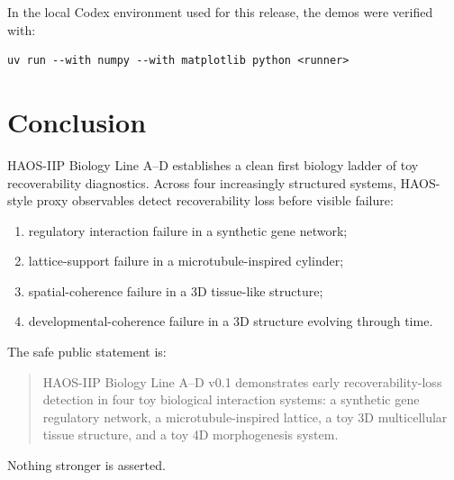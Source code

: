 \documentclass[11pt]{article}
\begin{document}
In the local Codex environment used for this release, the demos were verified with:

\begin{verbatim}
uv run --with numpy --with matplotlib python <runner>
\end{verbatim}

\section{Conclusion}

HAOS-IIP Biology Line A--D establishes a clean first biology ladder of toy recoverability diagnostics. Across four increasingly structured systems, HAOS-style proxy observables detect recoverability loss before visible failure:

\begin{enumerate}
\item regulatory interaction failure in a synthetic gene network;
\item lattice-support failure in a microtubule-inspired cylinder;
\item spatial-coherence failure in a 3D tissue-like structure;
\item developmental-coherence failure in a 3D structure evolving through time.
\end{enumerate}

The safe public statement is:

\begin{quote}
HAOS-IIP Biology Line A--D v0.1 demonstrates early recoverability-loss detection in four toy biological interaction systems: a synthetic gene regulatory network, a microtubule-inspired lattice, a toy 3D multicellular tissue structure, and a toy 4D morphogenesis system.
\end{quote}

Nothing stronger is asserted.
\end{document}

